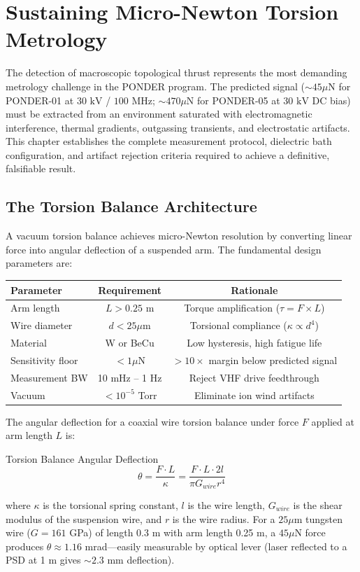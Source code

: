 \chapter{Sustaining Micro-Newton Torsion Metrology}
\label{ch:torsion_metrology}

The detection of macroscopic topological thrust represents the most demanding metrology challenge in the PONDER program. The predicted signal ($\sim 45 \mu\text{N}$ for PONDER-01 at $30 \text{ kV}$ / $100 \text{ MHz}$; $\sim 470 \mu\text{N}$ for PONDER-05 at $30 \text{ kV}$ DC bias) must be extracted from an environment saturated with electromagnetic interference, thermal gradients, outgassing transients, and electrostatic artifacts. This chapter establishes the complete measurement protocol, dielectric bath configuration, and artifact rejection criteria required to achieve a definitive, falsifiable result.

\section{The Torsion Balance Architecture}

A vacuum torsion balance achieves micro-Newton resolution by converting linear force into angular deflection of a suspended arm. The fundamental design parameters are:

\begin{center}
\begin{tabular}{|l|c|c|}
\hline
Parameter & Requirement & Rationale \\ \hline
Arm length & $L > 0.25$ m & Torque amplification ($\tau = F \times L$) \\
Wire diameter & $d < 25 \mu$m & Torsional compliance ($\kappa \propto d^4$) \\
Material & W or BeCu & Low hysteresis, high fatigue life \\
Sensitivity floor & $< 1 \mu$N & $>10\times$ margin below predicted signal \\
Measurement BW & 10 mHz -- 1 Hz & Reject VHF drive feedthrough \\
Vacuum & $< 10^{-5}$ Torr & Eliminate ion wind artifacts \\ \hline
\end{tabular}
\end{center}

The angular deflection for a coaxial wire torsion balance under force $F$ applied at arm length $L$ is:
\begin{resultbox}{Torsion Balance Angular Deflection}
\begin{equation}
    \theta = \frac{F \cdot L}{\kappa} = \frac{F \cdot L \cdot 2l}{\pi G_{wire} r^4}
\end{equation}
\end{resultbox}
where $\kappa$ is the torsional spring constant, $l$ is the wire length, $G_{wire}$ is the shear modulus of the suspension wire, and $r$ is the wire radius. For a $25 \mu$m tungsten wire ($G = 161$ GPa) of length 0.3 m with arm length 0.25 m, a $45 \mu$N force produces $\theta \approx 1.16$ mrad---easily measurable by optical lever (laser reflected to a PSD at 1 m gives $\sim 2.3$ mm deflection).

